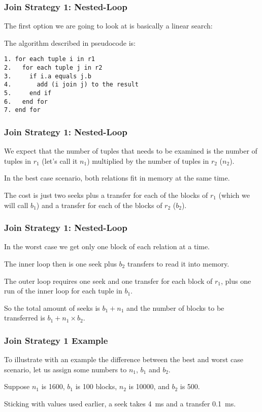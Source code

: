 \begin{frame}[fragile]
\frametitle{Join Strategy 1: Nested-Loop}

The first option we are going to look at is basically a linear search:

The algorithm described in pseudocode is:
\begin{verbatim}
1. for each tuple i in r1
2.   for each tuple j in r2
3.     if i.a equals j.b
4.       add (i join j) to the result
5.     end if
6.   end for
7. end for
\end{verbatim}

\end{frame}

\begin{frame}
\frametitle{Join Strategy 1: Nested-Loop}

We expect that the number of tuples that needs to be examined is the number of tuples in $r_{1}$ (let's call it $n_{1}$) multiplied by the number of tuples in $r_{2}$ ($n_{2}$). 

In the best case scenario, both relations fit in memory at the same time. 

The cost is just two seeks plus a transfer for each of the blocks of $r_{1}$ (which we will call $b_{1}$) and a transfer for each of the blocks of $r_{2}$ ($b_{2}$). 


\end{frame}


\begin{frame}
\frametitle{Join Strategy 1: Nested-Loop}

In the worst case we get only one block of each relation at a time. 

The inner loop then is one seek plus $b_{2}$ transfers to read it into memory.

The outer loop requires one seek and one transfer for each block of $r_{1}$, plus one run of the inner loop for each tuple in $b_{1}$. 

So the total amount of seeks is $b_{1} + n_{1}$ and the number of blocks to be transferred is $b_{1} + n_{1} \times b_{2}$.

\end{frame}

\begin{frame}
\frametitle{Join Strategy 1 Example}

To illustrate with an example the difference between the best and worst case scenario, let us assign some numbers to $n_{1}$, $b_{1}$ and $b_{2}$. 

Suppose $n_{1}$ is 1600, $b_{1}$ is 100 blocks, $n_{2}$ is 10000, and $b_{2}$ is 500. 

Sticking with values used earlier, a seek takes 4~ms and a transfer 0.1~ms. 

\end{frame}

